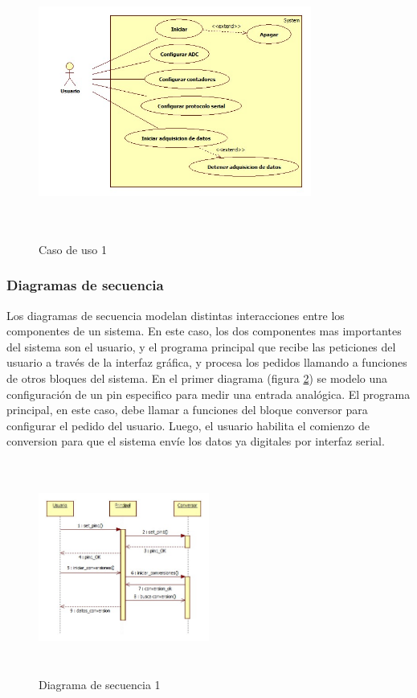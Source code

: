 \documentclass{article}
\theoremstyle{definition}
\theoremstyle{remark}
\begin{document}
\begin{figure}[h]
  \centering
  \includegraphics[width=0.80\textwidth, height = 9cm]{CasoUso1}
  \caption{Caso de uso 1}\label{fig:casouso1}
\end{figure}


\subsubsection{Diagramas de secuencia} %
\label{ssub:diagramas_de_secuencia}

Los diagramas de secuencia modelan distintas interacciones entre los componentes de un sistema. En este caso, los dos componentes mas importantes del sistema son el usuario, y el programa principal que recibe las peticiones del usuario a través de la interfaz gráfica, y procesa los pedidos llamando a funciones de otros bloques del sistema. En el primer diagrama (figura \ref{fig:secuencia1}) se modelo una configuración de un pin especifico para medir una entrada analógica. El programa principal, en este caso, debe llamar a funciones del bloque conversor para configurar el pedido del usuario. Luego, el usuario habilita el comienzo de conversion para que el sistema envíe los datos ya digitales por interfaz serial.

\begin{figure}[h]
  \centering
  \includegraphics[width=0.50\textwidth, height = 7cm]{Secuencia1}
  \caption{Diagrama de secuencia 1}\label{fig:secuencia1}
\end{figure}
\end{document}
